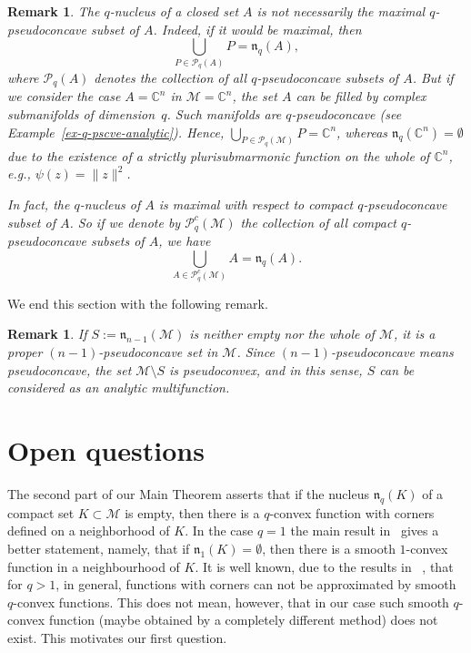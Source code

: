 \documentclass[11pt,a4paper]{article}
\newtheorem{rem}[lem]{Remark}
\newtheorem{ex}[lem]{Example}
\newcommand{\CC}{\mathbb{C}}
\newcommand{\PP}{\mathbb{P}}
\newcommand{\Mcal}{\mathcal{M}}
\newcommand{\Pcal}{\mathcal{P}}
\newcommand{\nuc}{\mathfrak{n}}
\begin{document}
\begin{rem}\label{ex-closed-q-nuc-1} The $q$-nucleus of a closed set $A$ is not necessarily the maximal $q$-pseudoconcave subset of $A$. Indeed, if it would be maximal, then
\[
\bigcup_{P \in \Pcal_q(A)} P = \nuc_q(A),
\]
where $\Pcal_q(A)$ denotes the collection of all $q$-pseudoconcave subsets of $A$. But if we consider the case $A=\CC^n$ in $\Mcal=\CC^n$, the set $A$ can be filled by complex submanifolds of dimension~$q$. Such manifolds are $q$-pseudoconcave  (see Example~\ref{ex-q-pscve-analytic}). Hence, $\bigcup_{P \in \Pcal_q(\Mcal)} P = \CC^n$, whereas $\nuc_q(\CC^n)=\emptyset$ due to the existence of a strictly plurisubmarmonic function on the whole of $\CC^n$, e.g., $\psi(z)=\|z\|^2$.

In fact, the $q$-nucleus of $A$ is maximal with respect to \emph{compact} $q$-pseudoconcave subset of $A$. So if we denote by $\Pcal^c_q(\Mcal)$ the collection of all compact $q$-pseudoconcave subsets of $A$, we have
\[
\bigcup_{A \in \Pcal^c_q(\Mcal)} A = \nuc_q(A).
\]
\end{rem}


We end this section with the following remark.

\begin{rem} If $S:=\nuc_{n-1}(\Mcal)$ is neither empty nor the whole of $\Mcal$, it is a proper $(n-1)$-pseudoconcave set in $\Mcal$. Since $(n-1)$-pseudoconcave means pseudoconcave, the set $\Mcal\setminus S$ is pseudoconvex, and in this sense, $S$ can be considered as an analytic multifunction. %
\end{rem}


\section{Open questions}


The second part of our Main Theorem asserts that if the nucleus $\nuc_q(K)$ of a compact set $K \subset \Mcal$ is empty, then there is a $q$-convex function with corners defined on a neighborhood of $K$. In the case $q=1$ the main result in~\cite{Shc21} gives a better statement, namely, that if $\nuc_1(K) = \emptyset$, then there is a smooth $1$-convex function  in a neighbourhood of $K$. It is well known, due to the results in ~\cite{DF}, that for $q > 1$, in general, functions with corners can not be approximated by smooth $q$-convex functions. This does not mean, however, that in our case such smooth $q$-convex function (maybe obtained by a completely different method) does not exist. This motivates our first question.
\end{document}
